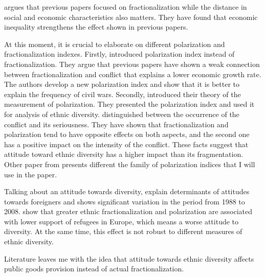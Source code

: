 \cite{difference} argues that previous papers focused on fractionalization while the distance in social and economic characteristics also matters. They have found that economic inequality strengthens the effect shown in previous papers.

At this moment, it is crucial to elaborate on different polarization and fractionalization indexes. Firstly, \cite{Reynal-Querol} introduced polarization index instead of fractionalization. They argue that previous papers have shown a weak connection between fractionalization and conflict that explains a lower economic growth rate. The authors develop a new polarization index and show that it is better to explain the frequency of civil wars. Secondly, \cite{EstebanRay} introduced their theory of the measurement of polarization. They presented the polarization index and used it for analysis of ethnic diversity. \cite{EstebanRayConflict} distinguished between the occurrence of the conflict and its seriousness. They have shown that fractionalization and polarization tend to have opposite effects on both aspects, and the second one has a positive impact on the intensity of the conflict. These facts suggest that attitude toward ethnic diversity has a higher impact than its fragmentation. Other paper from \cite{alpha} presents different the family of polarization indices that I will use in the paper.

Talking about an attitude towards diversity, \cite{Foreign} explain determinants of attitudes towards foreigners and shows significant variation in the period from 1988 to 2008. \cite{Refuges} show that greater ethnic fractionalization and polarization are associated with lower support of refugees in Europe, which means a worse attitude to diversity. At the same time, this effect is not robust to different measures of ethnic diversity. 

Literature leaves me with the idea that attitude towards ethnic diversity affects public goods provision instead of actual fractionalization.